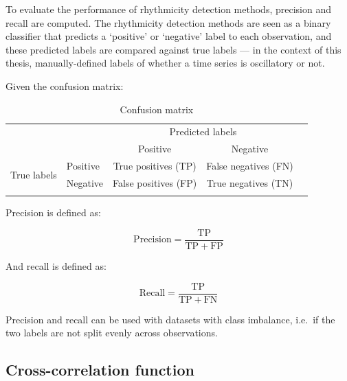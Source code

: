 To evaluate the performance of rhythmicity detection methods, precision and recall are computed.
The rhythmicity detection methods are seen as a binary classifier that predicts a `positive' or `negative' label to each observation, and these predicted labels are compared against true labels --- in the context of this thesis, manually-defined labels of whether a time series is oscillatory or not.

Given the confusion matrix:

\begin{table}[h]
  \centering
  \begin{tabular}{l|l|c|c|c}
    \multicolumn{2}{c}{}&\multicolumn{2}{c}{Predicted labels}&\\
    \cline{3-4}
    \multicolumn{2}{c|}{}&Positive&Negative&\multicolumn{1}{c}{}\\
    \cline{2-4}
    \multirow{2}{*}{True labels}& Positive & True positives (TP) & False negatives (FN) & \\
    \cline{2-4}
    & Negative & False positives (FP) & True negatives (TN) & \\
    \cline{2-4}
    \multicolumn{1}{c}{} & \multicolumn{1}{c}{} & \multicolumn{1}{c}{} & \multicolumn{1}{c}{} & \multicolumn{1}{c}{}\\
  \end{tabular}
  \caption[
    Confusion matrix
  ]{
    Confusion matrix
  }
  \label{tab:methods-confusion-matrix}
\end{table}

Precision is defined as:

\begin{equation}
  \mathrm{Precision} = \frac{\mathrm{TP}}{\mathrm{TP} + \mathrm{FP}}
  \label{eq:methods-precision}
\end{equation}

And recall is defined as:

\begin{equation}
  \mathrm{Recall} = \frac{\mathrm{TP}}{\mathrm{TP} + \mathrm{FN}}
  \label{eq:methods-recall}
\end{equation}

Precision and recall can be used with datasets with class imbalance, i.e.\ if the two labels are not split evenly across observations.


\subsection{Cross-correlation function}
\label{subsec:methods-computational-xcf}

